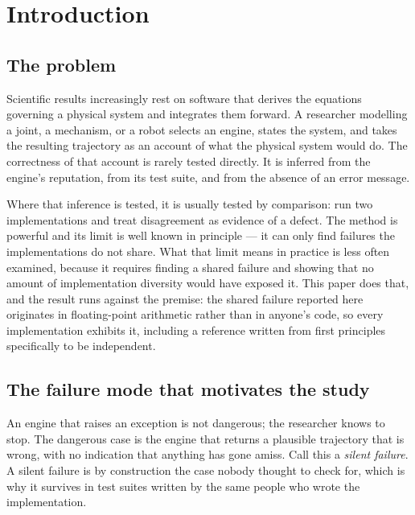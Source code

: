 \documentclass[review,12pt]{elsarticle}
\begin{document}
\linenumbers

\bigskip

\section{Introduction}

\subsection{The problem}
Scientific results increasingly rest on software that derives the equations
governing a physical system and integrates them forward. A researcher modelling
a joint, a mechanism, or a robot selects an engine, states the system, and takes
the resulting trajectory as an account of what the physical system would do. The
correctness of that account is rarely tested directly. It is inferred from the
engine's reputation, from its test suite, and from the absence of an error
message.

Where that inference is tested, it is usually tested by comparison: run two
implementations and treat disagreement as evidence of a defect. The method is
powerful and its limit is well known in principle --- it can only find failures
the implementations do not share. What that limit means in practice is less
often examined, because it requires finding a shared failure and showing that
no amount of implementation diversity would have exposed it. This paper does
that, and the result runs against the premise: the shared failure reported here
originates in floating-point arithmetic rather than in anyone's code, so every
implementation exhibits it, including a reference written from first principles
specifically to be independent.

\subsection{The failure mode that motivates the study}
An engine that raises an exception is not dangerous; the researcher knows to
stop. The dangerous case is the engine that returns a plausible trajectory that
is wrong, with no indication that anything has gone amiss. Call this a
\emph{silent failure}. A silent failure is by construction the case nobody
thought to check for, which is why it survives in test suites written by the
same people who wrote the implementation.
\end{document}
